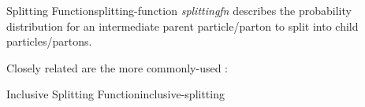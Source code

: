\begin{definitionbox}{Splitting Function}{splitting-function}
    \emph{\gls{splittingfn}} describes the probability distribution for an intermediate parent particle/parton to split into child particles/partons.


\end{definitionbox}

Closely related are the more commonly-used :


\begin{definitionbox}{Inclusive Splitting Function}{inclusive-splitting}
\end{definitionbox}


